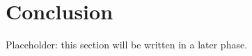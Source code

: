 \section{Conclusion}\label{sec:conclusion}

Placeholder: this section will be written in a later phase.
